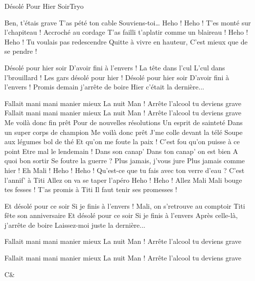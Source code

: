 \begin{Song}{Désolé Pour Hier Soir}{Tryo}
\begin{multicols}{2}
\begin{Verse}
Ben, t'étais grave
T'as pété ton cable
Souviens-toi\dots
Heho ! Heho !
T'es monté sur l'chapiteau !
Accroché au cordage
T'as failli t'aplatir comme un blaireau !
Heho ! Heho !
Tu voulais pas redescendre
Quitte à vivre en hauteur,
C'est mieux que de se pendre !
\end{Verse}
\begin{Chorus}
Désolé pour hier soir
D'avoir fini à l'envers !
La tête dans l'cul
L'cul dans l'brouillard !
Les gars désolé pour hier !
Désolé pour hier soir
D'avoir fini à l'envers !
Promis demain j'arrête de boire
Hier c'était la dernière...
\end{Chorus}
\begin{Verse}
Fallait mani mani manier mieux
La nuit Man !
Arrête l'alcool tu deviens grave
Fallait mani mani manier mieux
La nuit Man !
Arrête l'alcool tu deviens grave
Me voilà donc fin prêt
Pour de nouvelles résolutions
Un esprit de sainteté
Dans un super corps de champion
Me voilà donc prêt
J'me colle devant la télé
Soupe aux légumes bol de thé
Et qu'on me foute la paix !
C'est fou qu'on puisse à ce point
Etre mal le lendemain !
Dans son canap'
Dans ton canap' on est bien
A quoi bon sortir
Se foutre la guerre ?
Plus jamais, j'vous jure
Plus jamais comme hier !
Eh Mali !
Heho ! Heho !
Qu'est-ce que tu fais avec ton verre d'eau ?
C'est l'annif' à Titi
Allez on va se taper l'apéro
Heho ! Heho !
Allez Mali Mali bouge tes fesses !
T'as promis à Titi
Il faut tenir ses promesses !
\end{Verse}
\begin{Chorus}
Et désolé pour ce soir
Si je finis à l'envers !
Mali, on s'retrouve au comptoir
Titi fête son anniversaire
Et désolé pour ce soir
Si je finis à l'envers
Après celle-là, j'arrête de boire
Laissez-moi juste la dernière...
\end{Chorus}
\begin{Verse}
Fallait mani mani manier mieux
La nuit Man !
Arrête l'alcool tu deviens grave

Fallait mani mani manier mieux
La nuit Man !
Arrête l'alcool tu deviens grave
\end{Verse}
\end{multicols}

\vfill

\begin{Chords}
\hline
C\mineur & \\\hline
\end{Chords}

\vfill

\end{Song}

